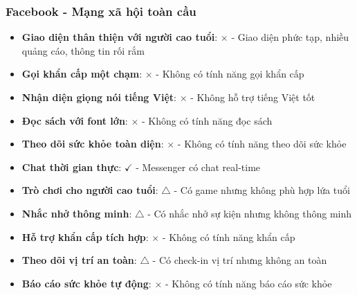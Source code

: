 \documentclass[12pt,a4paper]{article}
\begin{document}
\subsubsection{Facebook - Mạng xã hội toàn cầu}
\begin{itemize}[leftmargin=2cm]
    \item \textbf{Giao diện thân thiện với người cao tuổi}: $\times$ - Giao diện phức tạp, nhiều quảng cáo, thông tin rối rắm
    \item \textbf{Gọi khẩn cấp một chạm}: $\times$ - Không có tính năng gọi khẩn cấp
    \item \textbf{Nhận diện giọng nói tiếng Việt}: $\times$ - Không hỗ trợ tiếng Việt tốt
    \item \textbf{Đọc sách với font lớn}: $\times$ - Không có tính năng đọc sách
    \item \textbf{Theo dõi sức khỏe toàn diện}: $\times$ - Không có tính năng theo dõi sức khỏe
    \item \textbf{Chat thời gian thực}: $\checkmark$ - Messenger có chat real-time
    \item \textbf{Trò chơi cho người cao tuổi}: $\triangle$ - Có game nhưng không phù hợp lứa tuổi
    \item \textbf{Nhắc nhở thông minh}: $\triangle$ - Có nhắc nhở sự kiện nhưng không thông minh

    \item \textbf{Hỗ trợ khẩn cấp tích hợp}: $\times$ - Không có tính năng khẩn cấp
    \item \textbf{Theo dõi vị trí an toàn}: $\triangle$ - Có check-in vị trí nhưng không an toàn
    \item \textbf{Báo cáo sức khỏe tự động}: $\times$ - Không có tính năng báo cáo sức khỏe
\end{itemize}
\end{document}
